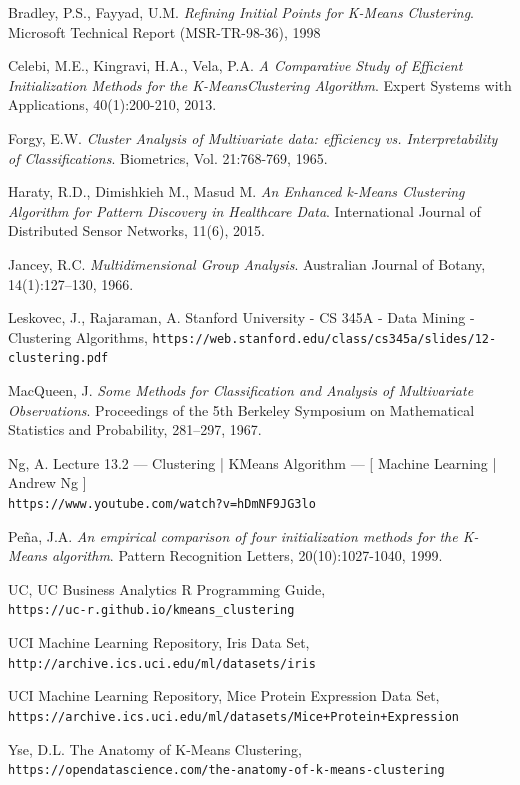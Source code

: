 \documentclass{article}
\begin{document}
\begin{thebibliography}{9}
Bradley, P.S., Fayyad, U.M.
\textit{Refining Initial Points for K-Means Clustering}.
Microsoft Technical Report (MSR-TR-98-36), 1998

Celebi, M.E., Kingravi, H.A., Vela, P.A. 
\textit{A Comparative Study of Efficient Initialization Methods for the K-MeansClustering Algorithm}.
Expert Systems with Applications, 40(1):200-210, 2013.

Forgy, E.W. 
\textit{Cluster Analysis of Multivariate data: efficiency vs. Interpretability of Classifications}.
Biometrics, Vol. 21:768-769, 1965.

Haraty, R.D., Dimishkieh M., Masud M.
\textit{An Enhanced k-Means Clustering Algorithm for Pattern Discovery in Healthcare Data}.
International Journal of Distributed Sensor Networks, 11(6), 2015.

Jancey, R.C.
\textit{Multidimensional Group Analysis}.
Australian Journal of Botany, 14(1):127–130, 1966.

Leskovec, J., Rajaraman, A. 
Stanford University - CS 345A - Data Mining - Clustering Algorithms,
\texttt{https://web.stanford.edu/class/cs345a/slides/12-clustering.pdf}

MacQueen, J. 
\textit{Some Methods for Classification and Analysis of Multivariate Observations}.
Proceedings of the 5th Berkeley Symposium on Mathematical Statistics and Probability, 281–297, 1967.

Ng, A.
Lecture 13.2 — Clustering | KMeans Algorithm — [ Machine Learning | Andrew Ng ]
\\\texttt{https://www.youtube.com/watch?v=hDmNF9JG3lo}

Peña, J.A. 
\textit{An empirical comparison of four initialization methods for the K-Means algorithm}.
Pattern Recognition Letters, 20(10):1027-1040, 1999.

UC,
UC Business Analytics R Programming Guide,
\\\texttt{https://uc-r.github.io/kmeans\_clustering}

UCI Machine Learning Repository,
Iris Data Set,
\\\texttt{http://archive.ics.uci.edu/ml/datasets/iris}

UCI Machine Learning Repository,
Mice Protein Expression Data Set,
\\\texttt{https://archive.ics.uci.edu/ml/datasets/Mice+Protein+Expression}

Yse, D.L. 
The Anatomy of K-Means Clustering,
\\\texttt{https://opendatascience.com/the-anatomy-of-k-means-clustering}


\end{thebibliography}
\end{document}
